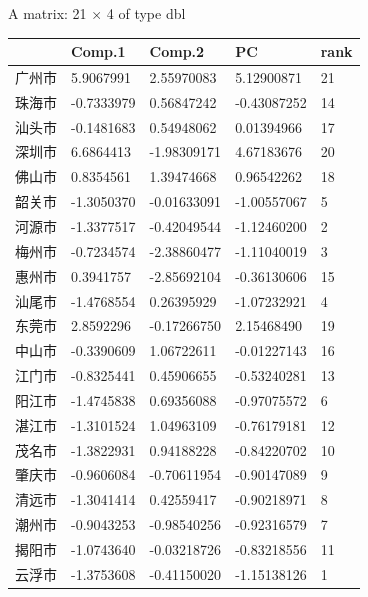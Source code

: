 \documentclass[UTF8,a4paper]{ctexart}
\begin{document}
    
    A matrix: 21 × 4 of type dbl
\begin{tabular}{r|llll}
  & Comp.1 & Comp.2 & PC & rank\\
\hline
	广州市 &  5.9067991 &  2.55970083 &  5.12900871 & 21\\
	珠海市 & -0.7333979 &  0.56847242 & -0.43087252 & 14\\
	汕头市 & -0.1481683 &  0.54948062 &  0.01394966 & 17\\
	深圳市 &  6.6864413 & -1.98309171 &  4.67183676 & 20\\
	佛山市 &  0.8354561 &  1.39474668 &  0.96542262 & 18\\
	韶关市 & -1.3050370 & -0.01633091 & -1.00557067 &  5\\
	河源市 & -1.3377517 & -0.42049544 & -1.12460200 &  2\\
	梅州市 & -0.7234574 & -2.38860477 & -1.11040019 &  3\\
	惠州市 &  0.3941757 & -2.85692104 & -0.36130606 & 15\\
	汕尾市 & -1.4768554 &  0.26395929 & -1.07232921 &  4\\
	东莞市 &  2.8592296 & -0.17266750 &  2.15468490 & 19\\
	中山市 & -0.3390609 &  1.06722611 & -0.01227143 & 16\\
	江门市 & -0.8325441 &  0.45906655 & -0.53240281 & 13\\
	阳江市 & -1.4745838 &  0.69356088 & -0.97075572 &  6\\
	湛江市 & -1.3101524 &  1.04963109 & -0.76179181 & 12\\
	茂名市 & -1.3822931 &  0.94188228 & -0.84220702 & 10\\
	肇庆市 & -0.9606084 & -0.70611954 & -0.90147089 &  9\\
	清远市 & -1.3041414 &  0.42559417 & -0.90218971 &  8\\
	潮州市 & -0.9043253 & -0.98540256 & -0.92316579 &  7\\
	揭阳市 & -1.0743640 & -0.03218726 & -0.83218556 & 11\\
	云浮市 & -1.3753608 & -0.41150020 & -1.15138126 &  1\\
\end{tabular}
\end{document}
